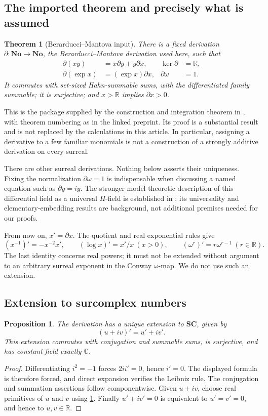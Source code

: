 \documentclass[11pt,letterpaper]{article}
\numberwithin{equation}{section}
\newtheorem{theorem}{Theorem}[section]
\newtheorem{proposition}[proposition]{Proposition}
\theoremstyle{definition}
\theoremstyle{remark}
\newcommand{\No}{\mathbf{No}}
\newcommand{\SC}{\mathbf{SC}}
\newcommand{\R}{\mathbb R}
\newcommand{\C}{\mathbb C}
\newcommand{\der}{\partial}
\begin{document}
\subsection{The imported theorem and precisely what is assumed}\label{subsec:BM}
\begin{theorem}[Berarducci--Mantova input]\label{thm:BM}
There is a fixed derivation $\der:\No\to\No$, the Berarducci--Mantova derivation used here, such that
\begin{align*}
 \der(xy)&=x\der y+y\der x,& \ker\der&=\R,\\
 \der(\exp x)&=(\exp x)\der x,& \der\omega&=1.
\end{align*}
It commutes with set-sized Hahn-summable sums, with the differentiated family summable; it is surjective; and $x>\R$ implies $\der x>0$.
\end{theorem}

This is the package supplied by the construction and integration theorem in \cite[Theorems 6.30 and 7.7]{BM}, with theorem numbering as in the linked preprint. Its proof is a substantial result and is not replaced by the calculations in this article. In particular, assigning a derivative to a few familiar monomials is not a construction of a strongly additive derivation on every surreal.

There are other surreal derivations. Nothing below asserts their uniqueness. Fixing the normalization $\der\omega=1$ is indispensable when discussing a named equation such as $\der y=iy$. The stronger model-theoretic description of this differential field as a universal $H$-field is established in \cite{ADH}; its universality and elementary-embedding results are background, not additional premises needed for our proofs.

From now on, $x'=\der x$. The quotient and real exponential rules give
\begin{equation}\label{eq:basicder}
 (x^{-1})'=-x^{-2}x',\qquad
 (\log x)'=x'/x\ (x>0),\qquad
 (\omega^r)'=r\omega^{r-1}\ (r\in\R).
\end{equation}
The last identity concerns real powers; it must not be extended without argument to an arbitrary surreal exponent in the Conway $\omega$-map. We do not use such an extension.

\subsection{Extension to surcomplex numbers}
\begin{proposition}\label{prop:complex}
The derivation has a unique extension to $\SC$, given by
\[
 (u+iv)'=u'+iv'.
\]
This extension commutes with conjugation and summable sums, is surjective, and has constant field exactly $\C$.
\end{proposition}
\begin{proof}
Differentiating $i^2=-1$ forces $2ii'=0$, hence $i'=0$. The displayed formula is therefore forced, and direct expansion verifies the Leibniz rule. The conjugation and summation assertions follow componentwise. Given $u+iv$, choose real primitives of $u$ and $v$ using \cref{thm:BM}. Finally $u'+iv'=0$ is equivalent to $u'=v'=0$, and hence to $u,v\in\R$.
\end{proof}
\end{document}
